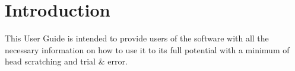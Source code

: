 
\newcommand{\doctitle}{MyProject User Guide}
\newcommand{\docauthors}{Martin Baute}



\section{Introduction}

This User Guide is intended to provide users of the software with all the
necessary information on how to use it to its full potential with a minimum
of head scratching and trial \& error. %



